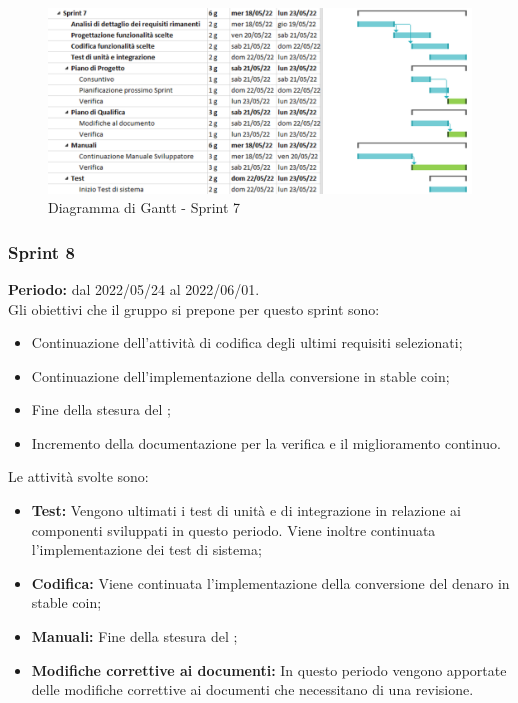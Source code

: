 \begin{figure}[H]
  \centering
  \includegraphics[scale=0.55]{immagini/7Sprint.png}
  \caption{Diagramma di Gantt - Sprint 7}
\end{figure}
\pagebreak

\subsubsection{Sprint 8} \label{subsubsection:sprint_8}
\textbf{Periodo:} dal 2022/05/24 al 2022/06/01.
\bigskip
\\Gli obiettivi che il gruppo si prepone per questo sprint\glo{} sono:
\begin{itemize}
  \item Continuazione dell'attività di codifica degli ultimi requisiti selezionati;
  \item Continuazione dell'implementazione della conversione in stable coin\glo{};
  \item Fine della stesura del \docNameVersionMS{};
  \item Incremento della documentazione per la verifica e il miglioramento continuo.
\end{itemize}
Le attività svolte sono:
\begin{itemize}
  \item \textbf{Test:} Vengono ultimati i test di unità e di integrazione in relazione ai componenti sviluppati in questo periodo. Viene inoltre continuata l'implementazione dei test di sistema;
  \item \textbf{Codifica:} Viene continuata l'implementazione della conversione del denaro in stable coin\glo{};
  \item \textbf{Manuali:} Fine della stesura del \docNameVersionMS{};
  \item \textbf{Modifiche correttive ai documenti:} In questo periodo vengono apportate delle modifiche correttive ai documenti che necessitano di una revisione.
\end{itemize}
